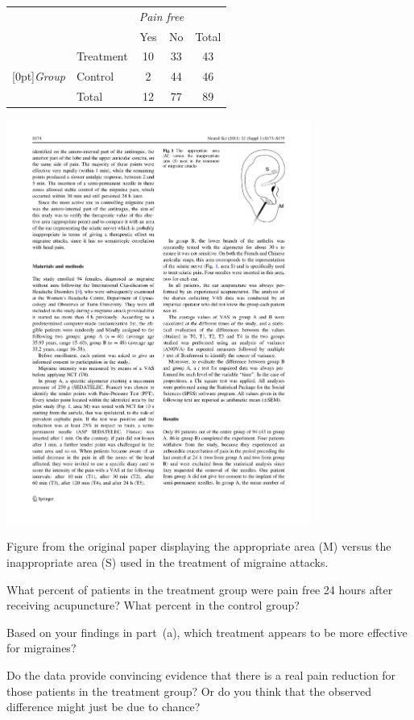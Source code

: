 {\noindent\begin{minipage}[l]{0.4\textwidth}
\begin{tabular}{ll  cc c} 
			&				& \multicolumn{2}{c}{\textit{Pain free}} \\
\cline{3-4}
			&							& Yes 	& No 	& Total	\\
\cline{2-5}
							&Treatment 	& 10	 	& 33		& 43 	\\
\raisebox{1.5ex}[0pt]{\emph{Group}}	& Control		& 2	 	& 44 	 	& 46 \\
\cline{2-5}
							&Total		& 12		& 77		& 89
\end{tabular}
\end{minipage}
\begin{minipage}[c]{0.05\textwidth}
\end{minipage}
\begin{minipage}[c]{0.27\textwidth}
\begin{center}
\includegraphics[width = 0.75\textwidth]{ch_data_collection/figures/eoce/images/earacupuncture}
\end{center}
\end{minipage}
\begin{minipage}[c]{0.25\textwidth}
{\footnotesize Figure from the original paper displaying the appropriate area (M) versus the inappropriate area (S) used in the treatment of migraine attacks.}
\end{minipage}
\begin{parts}
\item What percent of patients in the treatment group were pain free 24 hours after receiving acupuncture? What percent in the control group?
\item Based on your findings in part~(a), which treatment appears to be more effective for migraines?
\item Do the data provide convincing evidence that there is a real pain reduction for those patients in the treatment group? Or do you think that the observed difference might just be due to chance?
\end{parts}
}
{}

